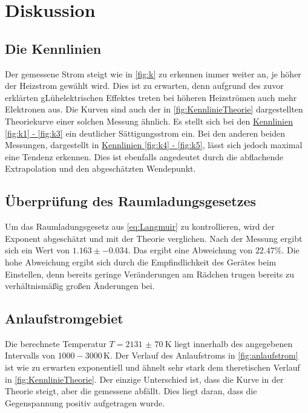 \section{Diskussion}
\label{sec:Diskussion}

\subsection{Die Kennlinien}
Der gemessene Strom steigt wie in \autoref{fig:k} zu erkennen immer weiter an, je höher der Heizstrom gewählt wird.
Dies ist zu erwarten, denn aufgrund des zuvor erklärten gLühelektrischen Effektes treten bei höheren Heizströmen auch mehr Elektronen aus.
Die Kurven sind auch der in \autoref{fig:KennlinieTheorie} dargestellten Theoriekurve einer solchen Messung ähnlich.
Es stellt sich bei den \hyperref[fig:k]{Kennlinien \ref{fig:k1} - \ref{fig:k3}} ein deutlicher Sättigungsstrom ein.
Bei den anderen beiden Messungen, dargestellt in \hyperref[fig:k]{Kennlinien \ref{fig:k4} - \ref{fig:k5}}, lässt sich jedoch maximal eine Tendenz erkennen. 
Dies ist ebenfalls angedeutet durch die abflachende Extrapolation und den abgeschätzten Wendepunkt.

\subsection{Überprüfung des Raumladungsgesetzes}
Um das Raumladungsgesetz aus \autoref{eq:Langmuir} zu kontrollieren, wird der Exponent abgeschätzt und mit der Theorie verglichen.
Nach der Messung ergibt sich ein Wert von $1.163\pm-0.034$.
Das ergibt eine Abweichung von $22.47 \%$.
Die hohe Abweichung ergibt sich durch die Empfindlichkeit des Gerätes beim Einstellen, denn bereits
geringe Veränderungen am Rädchen trugen bereits zu verhältnismäßig großen Änderungen bei.

\subsection{Anlaufstromgebiet}
Die berechnete Temperatur $T = \qty{2131(70)}{\kelvin}$ liegt innerhalb des angegebenen Intervalls
von $1000 - 3000 \, \mathrm{K}$. Der Verlauf des Anlaufstroms in \autoref{fig:anlaufstrom} ist wie zu erwarten exponentiell
und ähnelt sehr stark dem theretischen Verlauf in \autoref{fig:KennlinieTheorie}.
Der einzige Unterschied ist, dass die Kurve in der Theorie steigt, aber die gemessene abfällt.
Dies liegt daran, dass die Gegenspannung positiv aufgetragen wurde.